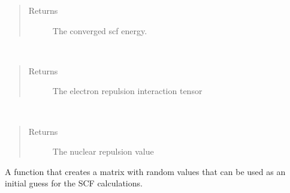\documentclass[letterpaper,10pt,english]{sphinxmanual}
\begin{document}
\begin{fulllineitems}
\begin{fulllineitems}
\begin{quote}
\begin{description}
\begin{itemize}
\end{itemize}

\item[{Returns}] \leavevmode
The converged scf energy.

\end{description}\end{quote}

\end{fulllineitems}


\begin{fulllineitems}
\label{\detokenize{GHF:hf.GHF.GHF.get_two_e}}~\begin{quote}\begin{description}
\item[{Returns}] \leavevmode
The electron repulsion interaction tensor

\end{description}\end{quote}

\end{fulllineitems}


\begin{fulllineitems}
\label{\detokenize{GHF:hf.GHF.GHF.nuc_rep}}~\begin{quote}\begin{description}
\item[{Returns}] \leavevmode
The nuclear repulsion value

\end{description}\end{quote}

\end{fulllineitems}


\begin{fulllineitems}
\label{\detokenize{GHF:hf.GHF.GHF.random_guess}}
A function that creates a matrix with random values that can be used as an initial guess
for the SCF calculations.


\end{fulllineitems}
\end{fulllineitems}
\end{document}
